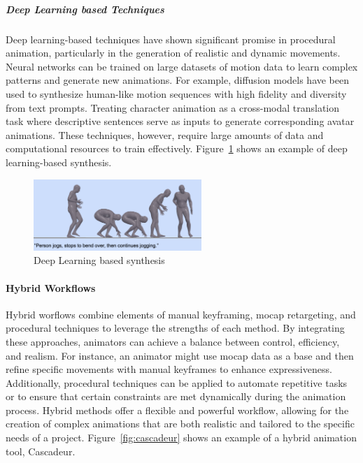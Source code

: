 \documentclass[../../main.tex]{subfiles}
\begin{document}
\subparagraph{Deep Learning based Techniques}
\label{ch:background_work:sign_language_synthesis:3d_techniques:avatar_animation:procedural_techniques:deep_learning_based_techniques}

Deep learning-based techniques have shown significant promise in procedural animation, particularly in the generation of realistic and dynamic movements. Neural networks can be trained on large datasets of motion data to learn complex patterns and generate new animations. For example, diffusion models have been used to synthesize human-like motion sequences with high fidelity and diversity from text prompts. Treating character animation as a cross-modal translation task where descriptive sentences serve as inputs to generate corresponding avatar animations. These techniques, however, require large amounts of data and computational resources to train effectively. Figure~\ref{fig:deep_learning_synthesis} shows an example of deep learning-based synthesis.

\begin{figure} 
  \centering \includegraphics[width = 2.5in]{chapters/background_work/images/deep_learning_synthesis.png} 
  \caption{Deep Learning based synthesis} 
  \label{fig:deep_learning_synthesis} 
\end{figure}

\paragraph{Hybrid Workflows}
\label{ch:background_work:sign_language_synthesis:3d_techniques:avatar_animation:hybrid_workflows}

Hybrid worflows combine elements of manual keyframing, mocap retargeting, and procedural techniques to leverage the strengths of each method. By integrating these approaches, animators can achieve a balance between control, efficiency, and realism. For instance, an animator might use mocap data as a base and then refine specific movements with manual keyframes to enhance expressiveness. Additionally, procedural techniques can be applied to automate repetitive tasks or to ensure that certain constraints are met dynamically during the animation process. Hybrid methods offer a flexible and powerful workflow, allowing for the creation of complex animations that are both realistic and tailored to the specific needs of a project. Figure~\ref{fig:cascadeur} shows an example of a hybrid animation tool, Cascadeur.
\end{document}
